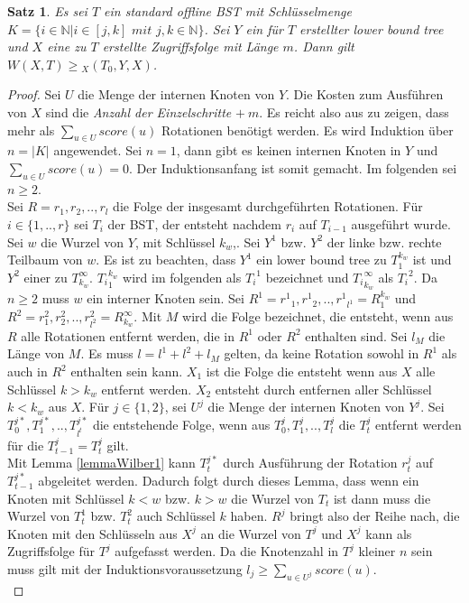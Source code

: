 \documentclass[a4paper,12pt]{article}
\begin{document}
\newtheorem{Satz1}{Satz}[section] \label{satzWilber1}
\begin{Satz1} Es sei $T$ ein standard offline BST mit Schlüsselmenge\\ ${K = \{  i \in \mathbb{N} \vert i \in \left[j,k\right] \textit{ mit } j,k \in  \mathbb{N} \}} $. Sei $Y$ ein für $T$ erstellter lower bound tree und $X$ eine zu $T$ erstellte Zugriffsfolge mit Länge $m$. Dann gilt\\  $W\left(X, T\right) \geq {_X(T_0, Y, X)} $.  
\end{Satz1}
\begin{proof}
	Sei $U$ die Menge der internen Knoten von $Y$. Die Kosten zum Ausführen von $X$ sind die \textit{Anzahl der Einzelschritte} $ +~m$. Es reicht also aus zu zeigen, dass mehr als $\sum_{u \in U} {\mathit{score}} \left(u\right)$ Rotationen benötigt werden. Es wird Induktion über  $n = \vert K \vert$ angewendet. Sei $n = 1$, dann gibt es keinen internen Knoten in $Y$ und $\sum_{u \in U} {\mathit{score}} \left(u\right) = 0$. Der Induktionsanfang ist somit gemacht. Im folgenden sei $n \geq 2$.\\
	Sei $R = r_1,r_2,..,r_l$ die Folge der insgesamt durchgeführten Rotationen. Für $i \in \{1,..,r\}$ sei $T_i$ der BST, der entsteht nachdem $r_i$ auf $T_{i-1}$ ausgeführt wurde. Sei $w$ die Wurzel von $Y$, mit Schlüssel $k_w$,. Sei $Y^1$ bzw. $Y^2$ der linke bzw. rechte Teilbaum von $w$. Es ist zu beachten, dass $Y^1$ ein lower bound tree zu $T_{1}^{k_w}$ ist und  $Y^2$ einer zu $T^\infty_{k_w}$. ${T_{i}}_1^{k_w}$ wird im folgenden als ${T_i}^1$ bezeichnet und ${T_{i}}_{k_w}^{\infty}$ als ${T_i}^2$. Da $n \geq 2$ muss $w$ ein interner Knoten sein. Sei  $R^1 = {r^1}_1,{r^1}_2,..,{r^1}_{l^1} = R^{k_w}_1$ und $R^2 = r^2_1,r^2_2,..,r^2_{l^2} = R^\infty_{k_w}$. Mit $M$ wird die Folge bezeichnet, die entsteht, wenn aus $R$ alle Rotationen entfernt werden, die in $R^1$ oder $R^2$ enthalten sind. Sei $l_M$ die Länge von $M$. Es muss $l = l^1 + l^2 + l_M$ gelten, da keine Rotation sowohl in $R^1$ als auch in $R^2$ enthalten sein kann. $X_1$ ist die Folge die entsteht wenn aus $X$ alle Schlüssel $k > k_w$ entfernt werden. $X_2$ entsteht durch entfernen aller Schlüssel $k < k_w$ aus $X$. Für $j \in \{1,2\}$, sei $U^j$ die Menge der internen Knoten von $Y^j$. Sei $T^{j*}_0,T^{j*}_1,..,T^{j*}_{l^t}$ die entstehende Folge, wenn aus $T^{j}_0,T^{j}_1,..,T^{j}_{l}$ die $T^j_t$ entfernt werden für die $T^j_{t-1} = T^j_t$ gilt.\\ Mit Lemma \ref{lemmaWilber1} kann  $T^{j*}_{t}$ durch Ausführung der Rotation $r^j_t$ auf $T^{j*}_{t-1}$ abgeleitet werden. Dadurch folgt durch dieses Lemma, dass wenn ein Knoten mit Schlüssel $k < w$ bzw. $k > w$ die Wurzel von $T_t$ ist dann muss die Wurzel von $T^1_t$ bzw. $T^2_t$ auch Schlüssel $k$ haben. $R^j$ bringt also der Reihe nach, die Knoten mit den Schlüsseln aus $X^j$ an die Wurzel von $T^j$ und  $X^j$ kann als Zugriffsfolge für $T^j$ aufgefasst werden. Da die Knotenzahl in $T^j$ kleiner $n$ sein muss gilt mit der Induktionsvoraussetzung  $l_j \geq \sum_{u \in U^j} {\mathit{score}} (u)$.\\

\end{proof}
\end{document}
